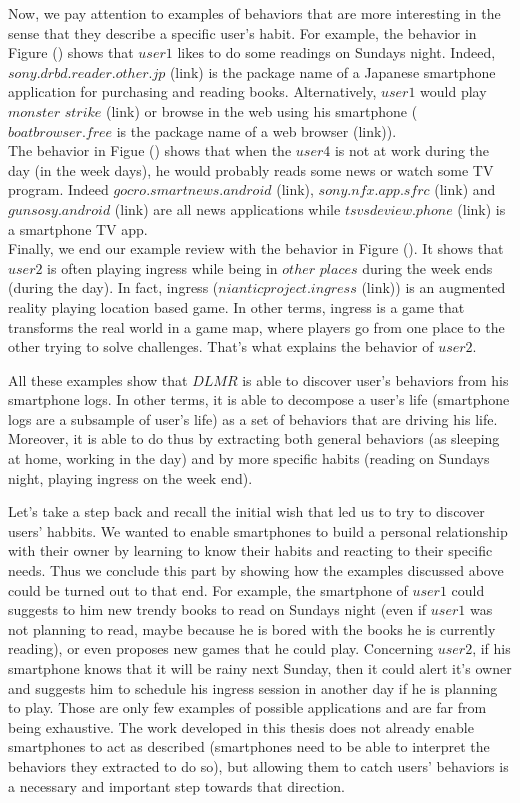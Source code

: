 Now, we pay attention to examples of behaviors that are more interesting in the sense that they describe a specific user's habit. For example, the behavior in Figure () shows that $user1$ likes to do some readings on Sundays night. Indeed, $sony.drbd.reader.other.jp$ (link) is the package name of a Japanese smartphone application for purchasing and reading books. Alternatively, $user1$ would play $monster$ $strike$ (link) or browse in the web using his smartphone ($boatbrowser.free$ is the package name of a web browser (link)). 
\\The behavior in Figue () shows that when the $user4$ is not at work during the day (in the week days), he would probably reads some news or watch some TV program. Indeed $gocro.smartnews.android$ (link), $sony.nfx.app.sfrc$ (link) and $gunsosy.android$ (link) are all news applications while $tsvsdeview.phone$ (link) is a smartphone TV app.
\\Finally, we end our example review with the behavior in Figure (). It shows that $user2$ is often playing ingress while being in $other$ $places$ during the week ends (during the day). In fact, ingress ($nianticproject.ingress$ (link)) is an augmented reality playing location based game. In other terms, ingress is a game that transforms the real world in a game map, where players go from one place to the other trying to solve challenges. That's what explains the behavior of $user2$. \par

All these examples show that $DLMR$ is able to discover user's behaviors from his smartphone logs. In other terms, it is able to decompose a user's life (smartphone logs are a subsample of user's life) as a set of behaviors that are driving his life. Moreover, it is able to do thus by extracting both general behaviors (as sleeping at home, working in the day) and by more specific habits (reading on Sundays night, playing ingress on the week end). \par

Let's take a step back and recall the initial wish that led us to try to discover users' habbits. We wanted to enable smartphones to build a personal relationship with their owner by learning to know their habits and reacting to their specific needs. Thus we conclude this part by showing how the examples discussed above could be turned out to that end. For example, the smartphone of $user1$ could suggests to him new trendy books to read on Sundays night (even if $user1$ was not planning to read, maybe because he is bored with the books he is currently reading), or even proposes new games that he could play. Concerning $user2$, if his smartphone knows that it will be rainy next Sunday, then it could alert it's owner and suggests him to schedule his ingress session in another day if he is planning to play. Those are only few examples of possible applications and are far from being exhaustive. The work developed in this thesis does not already enable smartphones to act as described (smartphones need to be able to interpret the behaviors they extracted to do so), but allowing them to catch users' behaviors is a necessary and important step towards that direction.